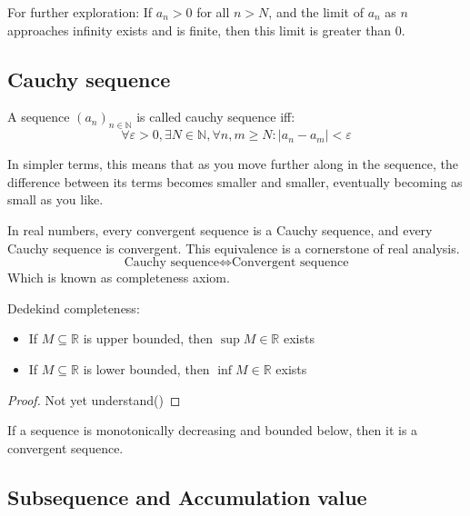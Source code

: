 \documentclass{article}
\newcommand{\R}{\mathbb{R}}
\begin{document}
For further exploration: If $a_n > 0$ for all $n > N$, and the limit of $a_n$ as $n$ approaches infinity exists and is finite, then this limit is greater than 0.




\subsection{Cauchy sequence}\label{Cauchy sequence}

\begin{definition}
	A sequence $(a_n)_{n\in \mathbb{N}}$ is called cauchy sequence iff:
	\begin{equation*}
		\forall \varepsilon >0, \exists N\in \mathbb{N}, \forall n,m\geq N: |a_n-a_m|<\varepsilon
	\end{equation*}
\end{definition}

In simpler terms, this means that as you move further along in the sequence, the difference between its terms becomes smaller and smaller, eventually becoming as small as you like. 
\begin{remark}
	In real numbers, every convergent sequence is a Cauchy sequence, and every Cauchy sequence is convergent. This equivalence is a cornerstone of real analysis.
	\begin{equation*}
		\text{Cauchy sequence} \Leftrightarrow \text{Convergent sequence}
	\end{equation*}
	Which is known as completeness axiom.
\end{remark}

\begin{theorem}
	Dedekind completeness: 
	\begin{itemize}
		\item If $M\subseteq \R$ is upper bounded, then $\sup M\in \R$ exists
		\item If $M\subseteq \R$ is lower bounded, then $\inf M\in \R$ exists
	\end{itemize}
\end{theorem}

\begin{proof}
	Not yet understand()
\end{proof}

\begin{theorem}
	If a sequence is monotonically decreasing and bounded below, then it is a convergent sequence.
\end{theorem}


\subsection{Subsequence and Accumulation value}
\end{document}
